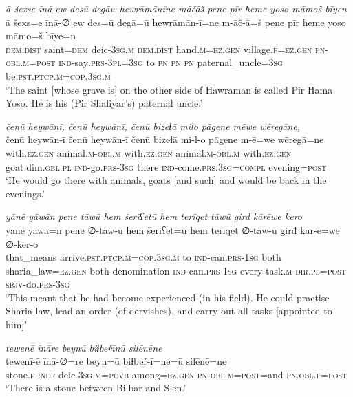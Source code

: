 \ea \label{ZP.6}
\textit{ā šexse īnā ew desū degāw hewrāmānīne māčāš pene pīr ħeme yoso māmoš bīyen} \\ 
\gll ā šexs=e īnā-∅ ew des=ū degā=ū hewrāmān-ī=ne m-āč-ā=š pene pīr ħeme yoso māmo=š bīye=n \\ 
 \textsc{dem.dist} saint\textsc{=dem} deic\textsc{-3sg}\textsc{.m} \textsc{dem.dist} hand\textsc{.m}\textsc{\textsc{=ez.gen}} village\textsc{.f}\textsc{\textsc{=ez.gen}} \textsc{pn}\textsc{-obl}\textsc{.m}\textsc{=\textsc{post}} \textsc{ind-}say\textsc{.prs}\textsc{-3pl}\textsc{=3sg} to \textsc{pn} \textsc{pn} \textsc{pn} paternal\_uncle\textsc{=3sg} be\textsc{.pst}\textsc{.ptcp}\textsc{.m}\textsc{=cop}\textsc{.3sg}\textsc{.m} \\ 
\glt `The saint [whose grave is] on the other side of Hawraman is called Pir Hama Yoso. He is his (Pir Shaliyar’s) paternal uncle.'
\z 
 
\ea \label{ZP.12}
\textit{čenū heywānī, čenū heywānī, čenū bizeɫā milo pāgene mēwe wēregāne,} \\ 
\gll čenū heywān-ī čenū heywān-ī čenū bizeɫā mi-l-o pāgene m-ē=we wēregā=ne \\ 
 with\textsc{.ez.gen} animal\textsc{.m}\textsc{-obl}\textsc{.m} with\textsc{.ez.gen} animal\textsc{.m}\textsc{-obl}\textsc{.m} with\textsc{.ez.gen} goat.dim\textsc{.obl}\textsc{.pl} \textsc{ind-}go\textsc{.prs}\textsc{-3sg} there \textsc{ind-}come\textsc{.prs}\textsc{.3sg}\textsc{=compl} evening\textsc{=\textsc{post}} \\ 
\glt `He would go there with animals, goats [and such] and would be back in the evenings.'
\z 
 
\ea \label{ZP.19}
\textit{yānē yāwān pene tāwū hem šerīʕetū hem terīqet tāwū girđ kārēwe kero} \\ 
\gll yānē yāwā=n pene ∅-tāw-ū hem šerīʕet=ū hem terīqet ∅-tāw-ū girđ kār-ē=we ∅-ker-o \\ 
 that\_means arrive\textsc{.pst}\textsc{.ptcp}\textsc{.m}\textsc{=cop}\textsc{.3sg}\textsc{.m} to \textsc{ind-}can\textsc{.prs}\textsc{-\textsc{1sg}} both sharia\_law\textsc{\textsc{=ez.gen}} both denomination \textsc{ind-}can\textsc{.prs}\textsc{-\textsc{1sg}} every task\textsc{.m}\textsc{-dir}\textsc{.pl}\textsc{=\textsc{post}} \textsc{sbjv-}do\textsc{.prs}\textsc{-3sg} \\ 
\glt `This meant that he had become experienced (in his field). He could practise Sharia law, lead an order (of dervishes), and carry out all tasks [appointed to him]'
\z 
 
\ea \label{ZP.50}
\textit{tewenē īnāre beynū biɫbeřīnū silēnēne} \\ 
\gll tewenī-ē īnā-∅=re beyn=ū biɫbeř-ī=ne=ū silēnē=ne \\ 
 stone\textsc{.f}\textsc{-indf} deic\textsc{-3sg}\textsc{.m}\textsc{=\textsc{povb}} among\textsc{\textsc{=ez.gen}} \textsc{pn}\textsc{-obl}\textsc{.m}\textsc{=\textsc{post}}=and \textsc{pn}\textsc{.obl}\textsc{.f}\textsc{=\textsc{post}} \\ 
\glt `There is a stone between Bilbar and Slen.'
\z 
 
